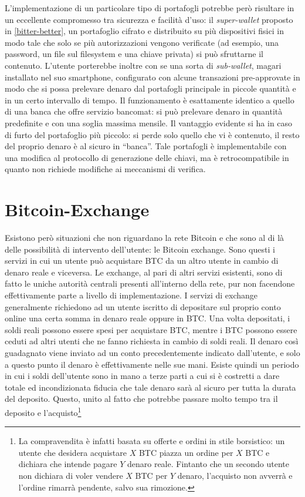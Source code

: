 L'implementazione di un particolare tipo di portafogli potrebbe però risultare in un eccellente compromesso tra sicurezza e facilità d'uso: il \emph{super-wallet} proposto in \ref{bitter-better}, un portafoglio cifrato e distribuito su più dispositivi fisici in modo tale che solo se più autorizzazioni vengono verificate (ad esempio, una password, un file sul filesystem e una chiave privata) si può sfruttarne il contenuto. L'utente porterebbe inoltre con se una sorta di \emph{sub-wallet}, magari installato nel suo smartphone, configurato con alcune transazioni pre-approvate in modo che si possa prelevare denaro dal portafogli principale in piccole quantità e in un certo intervallo di tempo. Il funzionamento è esattamente identico a quello di una banca che offre servizio bancomat: si può prelevare denaro in quantità predefinite e con una soglia massima mensile. Il vantaggio evidente si ha in caso di furto del portafoglio più piccolo: si perde solo quello che vi è contenuto, il resto del proprio denaro è al sicuro in ``banca''.
Tale portafogli è implementabile con una modifica al protocollo di generazione delle chiavi, ma è retrocompatibile in quanto non richiede modifiche ai meccanismi di verifica.

\section{Bitcoin-Exchange}\label{bitcoin-exchange}

Esistono però situazioni che non riguardano la rete Bitcoin e che sono al di là delle possibilità di intervento dell'utente: le Bitcoin exchange.
Sono questi i servizi in cui un utente può acquistare BTC da un altro utente in cambio di denaro reale e viceversa. Le exchange, al pari di altri servizi esistenti, sono di fatto le uniche autorità centrali presenti all'interno della rete, pur non facendone effettivamente parte a livello di implementazione.
I servizi di exchange generalmente richiedono ad un utente iscritto di depositare sul proprio conto online una certa somma in denaro reale oppure in BTC. Una volta depositati, i soldi reali possono essere spesi per acquistare BTC, mentre i BTC possono essere ceduti ad altri utenti che ne fanno richiesta in cambio di soldi reali. Il denaro così guadagnato viene inviato ad un conto precedentemente indicato dall'utente, e solo a questo punto il denaro è effettivamente nelle sue mani.
Esiste quindi un periodo in cui i soldi dell'utente sono in mano a terze parti a cui si è costretti a dare totale ed incondizionata fiducia che tale denaro sarà al sicuro per tutta la durata del deposito. Questo, unito al fatto che potrebbe passare molto tempo tra il deposito e l'acquisto\footnote{La compravendita è infatti basata su offerte e ordini in stile borsistico: un utente che desidera acquistare $X$ BTC piazza un ordine per $X$ BTC e dichiara che intende pagare $Y$ denaro reale. Fintanto che un secondo utente non dichiara di voler vendere $X$ BTC per $Y$ denaro, l'acquisto non avverrà e l'ordine rimarrà pendente, salvo sua rimozione.}


